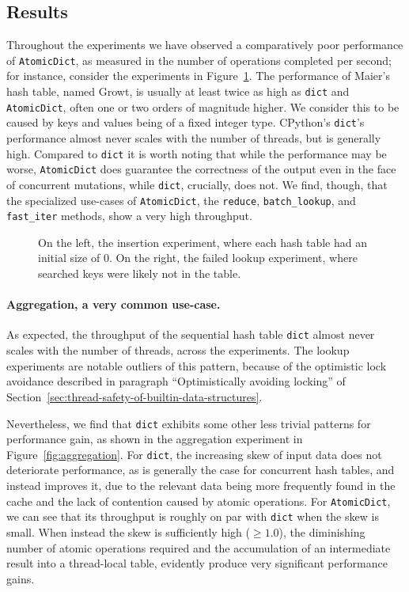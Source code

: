 \subsection{Results}\label{subsec:comparisons-results}

Throughout the experiments we have observed a comparatively poor performance of \texttt{AtomicDict}, as measured in the number of operations completed per second; for instance, consider the experiments in Figure~\ref{fig:bad}.
The performance of Maier's hash table, named Growt, is usually at least twice as high as \texttt{dict} and \texttt{AtomicDict}, often one or two orders of magnitude higher.
We consider this to be caused by keys and values being of a fixed integer type.
CPython's \texttt{dict}'s performance almost never scales with the number of threads, but is generally high.
Compared to \texttt{dict} it is worth noting that while the performance may be worse, \texttt{AtomicDict} does guarantee the correctness of the output even in the face of concurrent mutations, while \texttt{dict}, crucially, does not.
We find, though, that the specialized use-cases of \texttt{AtomicDict}, the \texttt{reduce}, \texttt{{batch\_lookup}}, and \texttt{fast\_iter} methods, show a very high throughput.

\begin{figure}
    \begin{centering}
        \scalebox{0.4}{}%
        \scalebox{0.4}{}
        \caption{On the left, the insertion experiment, where each hash table had an initial size of 0. On the right, the failed lookup experiment, where searched keys were likely not in the table.}
        \label{fig:bad}
    \end{centering}
\end{figure}

\paragraph{Aggregation, a very common use-case.} As expected, the throughput of the sequential hash table \texttt{dict} almost never scales with the number of threads, across the experiments.
The lookup experiments are notable outliers of this pattern, because of the optimistic lock avoidance described in paragraph ``Optimistically avoiding locking'' of Section~\ref{sec:thread-safety-of-builtin-data-structures}.

Nevertheless, we find that \texttt{dict} exhibits some other less trivial patterns for performance gain, as shown in the aggregation experiment in Figure~\ref{fig:aggregation}.
For \texttt{dict}, the increasing skew of input data does not deteriorate performance, as is generally the case for concurrent hash tables, and instead improves it, due to the relevant data being more frequently found in the cache and the lack of contention caused by atomic operations.
For \texttt{AtomicDict}, we can see that its throughput is roughly on par with \texttt{dict} when the skew is small.
When instead the skew is sufficiently high ($\geq 1.0$), the diminishing number of atomic operations required and the accumulation of an intermediate result into a thread-local table, evidently produce very significant performance gains.

